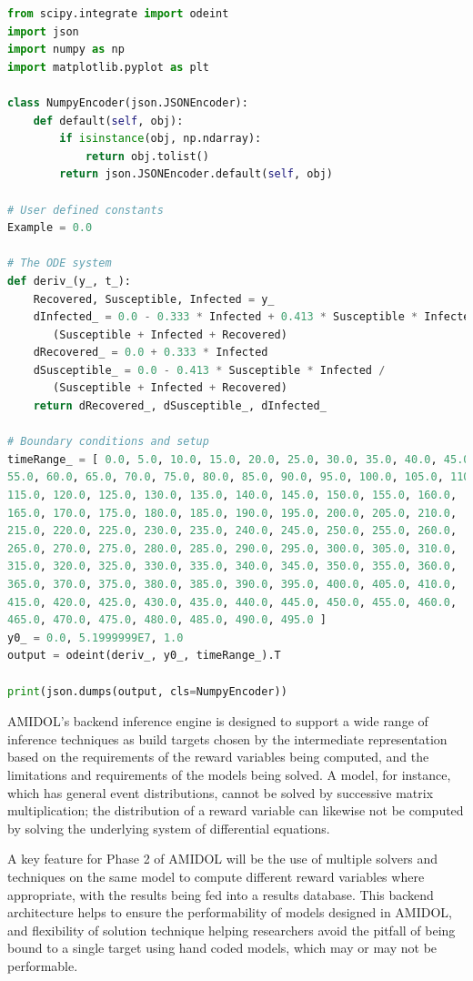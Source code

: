 \documentclass[11pt]{article}
\newcommand{\amidol}{\textsc{AMIDOL}}
\begin{document}
\begin{lstlisting}[language=python]
from scipy.integrate import odeint
import json
import numpy as np
import matplotlib.pyplot as plt

class NumpyEncoder(json.JSONEncoder):
    def default(self, obj):
        if isinstance(obj, np.ndarray):
            return obj.tolist()
        return json.JSONEncoder.default(self, obj)

# User defined constants
Example = 0.0

# The ODE system
def deriv_(y_, t_):
    Recovered, Susceptible, Infected = y_
    dInfected_ = 0.0 - 0.333 * Infected + 0.413 * Susceptible * Infected /
       (Susceptible + Infected + Recovered)
    dRecovered_ = 0.0 + 0.333 * Infected
    dSusceptible_ = 0.0 - 0.413 * Susceptible * Infected /
       (Susceptible + Infected + Recovered)
    return dRecovered_, dSusceptible_, dInfected_

# Boundary conditions and setup
timeRange_ = [ 0.0, 5.0, 10.0, 15.0, 20.0, 25.0, 30.0, 35.0, 40.0, 45.0, 50.0,
55.0, 60.0, 65.0, 70.0, 75.0, 80.0, 85.0, 90.0, 95.0, 100.0, 105.0, 110.0,
115.0, 120.0, 125.0, 130.0, 135.0, 140.0, 145.0, 150.0, 155.0, 160.0,
165.0, 170.0, 175.0, 180.0, 185.0, 190.0, 195.0, 200.0, 205.0, 210.0,
215.0, 220.0, 225.0, 230.0, 235.0, 240.0, 245.0, 250.0, 255.0, 260.0,
265.0, 270.0, 275.0, 280.0, 285.0, 290.0, 295.0, 300.0, 305.0, 310.0,
315.0, 320.0, 325.0, 330.0, 335.0, 340.0, 345.0, 350.0, 355.0, 360.0,
365.0, 370.0, 375.0, 380.0, 385.0, 390.0, 395.0, 400.0, 405.0, 410.0,
415.0, 420.0, 425.0, 430.0, 435.0, 440.0, 445.0, 450.0, 455.0, 460.0,
465.0, 470.0, 475.0, 480.0, 485.0, 490.0, 495.0 ]
y0_ = 0.0, 5.1999999E7, 1.0
output = odeint(deriv_, y0_, timeRange_).T

print(json.dumps(output, cls=NumpyEncoder))
\end{lstlisting}

\amidol{}'s backend inference engine is designed to support a wide range of inference techniques as build targets chosen by the intermediate representation based on the requirements of the reward variables being computed, and the limitations and requirements of the models being solved.  A model, for instance, which has general event distributions, cannot be solved by successive matrix multiplication; the distribution of a reward variable can likewise not be computed by solving the underlying system of differential equations.

A key feature for Phase 2 of \amidol{} will be the use of multiple solvers and techniques on the same model to compute different reward variables where appropriate, with the results being fed into a results database.  This  backend architecture helps to ensure the performability of models designed in \amidol{}, and flexibility of solution technique helping researchers avoid the pitfall of being bound to a single target using hand coded models, which may or may not be performable.
\end{document}
